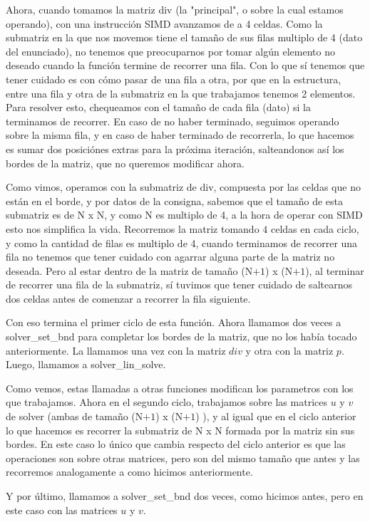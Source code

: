 \par Ahora, cuando tomamos la matriz div (la "principal", o sobre la cual estamos operando), con una instrucción SIMD avanzamos de a 4 celdas. Como la submatriz en la que nos movemos tiene el tamaño de sus filas multiplo de 4 (dato del enunciado), no tenemos que preocuparnos por tomar algún elemento no deseado cuando la función termine de recorrer una fila.
Con lo que sí tenemos que tener cuidado es con cómo pasar de una fila a otra, por que en la estructura, entre una fila y otra de la submatriz en la que trabajamos tenemos 2 elementos.
Para resolver esto, chequeamos con el tamaño de cada fila (dato) si la terminamos de recorrer.
En caso de no haber terminado, seguimos operando sobre la misma fila, y en caso de haber terminado de recorrerla, lo que hacemos es sumar dos posiciónes extras para la próxima iteración, salteandonos así los bordes de la matriz, que no queremos modificar ahora.

\par Como vimos, operamos con la submatriz de div, compuesta por las celdas que no están en el borde, y por datos de la consigna, sabemos que el tamaño de esta submatriz es de N x N, y como N es multiplo de 4, a la hora de operar con SIMD esto nos simplifica la vida.
Recorremos la matriz tomando $4$ celdas en cada ciclo, y como la cantidad de filas es multiplo de 4, cuando terminamos de recorrer una fila no tenemos que tener cuidado con agarrar alguna parte de la matriz no deseada.
Pero al estar dentro de la matriz de tamaño (N$+$$1$) x (N$+$$1$), al terminar de recorrer una fila de la submatriz, sí tuvimos que tener cuidado de saltearnos dos celdas antes de comenzar a recorrer la fila siguiente.\newline

\par Con eso termina el primer ciclo de esta función. Ahora llamamos dos veces a solver\_set\_bnd para completar los bordes de la matriz, que no los había tocado anteriormente.
La llamamos una vez con la matriz $div$ y otra con la matriz $p$.
Luego, llamamos a solver\_lin\_solve.\newline

\par Como vemos, estas llamadas a otras funciones modifican los parametros con los que trabajamos.
Ahora en el segundo ciclo, trabajamos sobre las matrices $u$ y $v$ de solver (ambas de tamaño (N$+$$1$) x (N$+$$1$) ), y al igual que en el ciclo anterior lo que hacemos es recorrer la submatriz de N x N formada por la matriz sin sus bordes.
En este caso lo único que cambia respecto del ciclo anterior es que las operaciones son sobre otras matrices, pero son del mismo tamaño que antes y las recorremos analogamente a como hicimos anteriormente.\newline

\par Y por último, llamamos a solver\_set\_bnd dos veces, como hicimos antes, pero en este caso con las matrices $u$ y $v$.\newline
